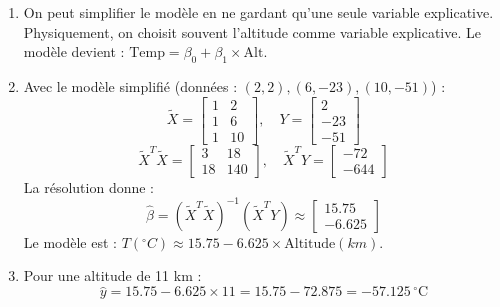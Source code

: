\documentclass[solutions]{../exercices}
\begin{document}
\begin{solution}
\begin{enumerate}
        \item On peut simplifier le modèle en ne gardant qu'une seule variable explicative. Physiquement, on choisit souvent l'altitude comme variable explicative. Le modèle devient : $\text{Temp} = \beta_0 + \beta_1 \times \text{Alt}$.

        \item Avec le modèle simplifié (données : $(2, 2), (6, -23), (10, -51)$) :
        \[
            \tilde{X} = \begin{bmatrix} 1 & 2 \\ 1 & 6 \\ 1 & 10 \end{bmatrix}, \quad Y = \begin{bmatrix} 2 \\ -23 \\ -51 \end{bmatrix}
        \]
        \[
            \tilde{X}^T \tilde{X} = \begin{bmatrix} 3 & 18 \\ 18 & 140 \end{bmatrix}, \quad \tilde{X}^T Y = \begin{bmatrix} -72 \\ -644 \end{bmatrix}
        \]
        La résolution donne :
        \[
            \hat{\beta} = (\tilde{X}^T \tilde{X})^{-1} (\tilde{X}^T Y) \approx \begin{bmatrix} 15.75 \\ -6.625 \end{bmatrix}
        \]
        Le modèle est : $T(^\circ C) \approx 15.75 - 6.625 \times \text{Altitude}(km)$.

        \item Pour une altitude de 11 km :
        \[
            \hat{y} = 15.75 - 6.625 \times 11 = 15.75 - 72.875 = -57.125 \,^\circ\text{C}
        \]
    \end{enumerate}
\end{solution}
\end{document}
